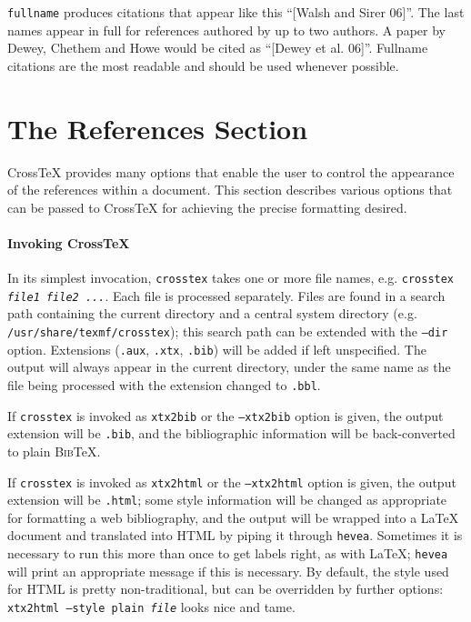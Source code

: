 \documentclass{article}
\newcommand{\XTeX}{Cross\TeX}
\newcommand{\BibTeX}{\textsc{Bib}\TeX}
\begin{document}
\texttt{fullname} produces citations that appear like this ``[Walsh and Sirer 06]''. The last names appear in full for
references authored by up to two authors. A paper by Dewey, Chethem and Howe would be cited as ``[Dewey et al. 06]''.
Fullname citations are the most readable and should be used whenever possible. 

\section{The References Section}

\XTeX{} provides many options that enable the user to control the appearance
of the references within a document. This section describes various options
that can be passed to \XTeX{} for achieving the precise formatting desired. 

\paragraph{Invoking CrossTeX}

In its simplest invocation, \texttt{crosstex} takes one or more file names, e.g. \texttt{crosstex \textrm{\textit{file1 file2 ...}}}. Each file is processed separately. Files are found in a search path containing the current directory and a central system directory (e.g. \texttt{/usr/share/texmf/crosstex}); this search path can be extended with the \texttt{--dir} option. Extensions (\texttt{.aux}, \texttt{.xtx}, \texttt{.bib}) will be added if left unspecified. The output will always appear in the current directory, under the same name as the file being processed with the extension changed to \texttt{.bbl}.

If \texttt{crosstex} is invoked as \texttt{xtx2bib} or the \texttt{--xtx2bib} option is given, the output extension will be \texttt{.bib}, and the bibliographic information will be back-converted to plain \BibTeX{}.

If \texttt{crosstex} is invoked as \texttt{xtx2html} or the \texttt{--xtx2html} option is given, the output extension will be \texttt{.html}; some style information will be changed as appropriate for formatting a web bibliography, and the output will be wrapped into a \LaTeX{} document and translated into HTML by piping it through \texttt{hevea}. Sometimes it is necessary to run this more than once to get labels right, as with \LaTeX{}; \texttt{hevea} will print an appropriate message if this is necessary. By default, the style used for HTML is pretty non-traditional, but can be overridden by further options: \texttt{xtx2html --style plain \textrm{\textit{file}}} looks nice and tame.
\end{document}
